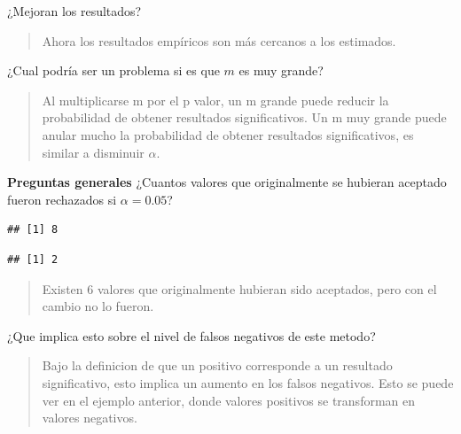 \documentclass[]{article}
\newenvironment{Shaded}{\begin{snugshade}}{\end{snugshade}}
\newcommand{\FunctionTok}[1]{\textcolor[rgb]{0.00,0.00,0.00}{#1}}
\newcommand{\NormalTok}[1]{#1}
\newcommand{\SpecialCharTok}[1]{\textcolor[rgb]{0.00,0.00,0.00}{#1}}
\begin{document}
¿Mejoran los resultados?

\begin{quote}
Ahora los resultados empíricos son más cercanos a los estimados.
\end{quote}

¿Cual podría ser un problema si es que \(m\) es muy grande?

\begin{quote}
Al multiplicarse m por el p valor, un m grande puede reducir la
probabilidad de obtener resultados significativos. Un m muy grande puede
anular mucho la probabilidad de obtener resultados significativos, es
similar a disminuir \(\alpha\).
\end{quote}

\textbf{Preguntas generales} ¿Cuantos valores que originalmente se
hubieran aceptado fueron rechazados si \(\alpha = 0.05\)?

\begin{Shaded}
\end{Shaded}

\begin{verbatim}
## [1] 8
\end{verbatim}

\begin{Shaded}
\end{Shaded}

\begin{verbatim}
## [1] 2
\end{verbatim}

\begin{quote}
Existen 6 valores que originalmente hubieran sido aceptados, pero con el
cambio no lo fueron.
\end{quote}

¿Que implica esto sobre el nivel de falsos negativos de este metodo?

\begin{quote}
Bajo la definicion de que un positivo corresponde a un resultado
significativo, esto implica un aumento en los falsos negativos. Esto se
puede ver en el ejemplo anterior, donde valores positivos se transforman
en valores negativos.
\end{quote}
\end{document}
